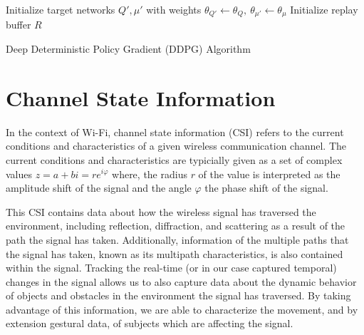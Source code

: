 \begin{algorithm}
	\SetAlgoLined
	Initialize target networks $Q', \mu'$ with weights $\theta_{Q'} \leftarrow \theta_Q,~\theta_{\mu'} \leftarrow \theta_\mu$\;
	Initialize replay buffer $R$\;
	\caption{Deep Deterministic Policy Gradient (DDPG) Algorithm}\label{algo:ddpg}
\end{algorithm}

\section{Channel State Information}

In the context of Wi-Fi, channel state information (CSI) refers to the current conditions and characteristics of a given wireless communication channel.
The current conditions and characteristics are typicially given as a set of complex values $z = a + bi = re^{i \varphi}$ where, the radius $r$ of the value is interpreted as the amplitude shift of the signal and the angle $\varphi$ the phase shift of the signal.

This CSI contains data about how the wireless signal has traversed the environment, including reflection, diffraction, and scattering as a result of the path the signal has taken.
Additionally, information of the multiple paths that the signal has taken, known as its multipath characteristics, is also contained within the signal.
Tracking the real-time (or in our case captured temporal) changes in the signal allows us to also capture data about the dynamic behavior of objects and obstacles in the environment the signal has traversed. By taking advantage of this information, we are able to characterize the movement, and by extension gestural data, of subjects which are affecting the signal.


